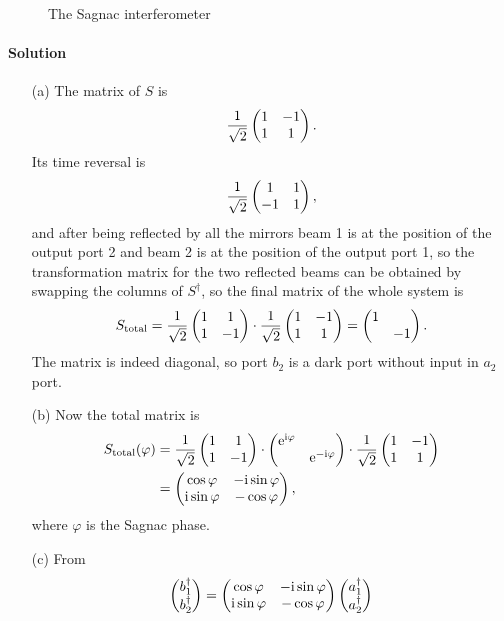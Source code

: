 \documentclass[hyperref, a4paper]{article}
\newcommand*{\ii}{\mathrm{i}}
\newcommand*{\ee}{\mathrm{e}}
\begin{document}
\begin{figure}
    \centering
    
    \caption{The Sagnac interferometer}
    \label{fig:sagnac-device}
\end{figure}

\paragraph{Solution} \begin{itemize}
    \item[(a)] The matrix of $S$ is 
    \[
        \frac{1}{\sqrt{2}} \pmqty{ 1 & -1 \\ 1 & 1 }.
    \]
    Its time reversal is 
    \[
        \frac{1}{\sqrt{2}} \pmqty{ 1 & 1 \\ -1 & 1 },
    \]
    and after being reflected by all the mirrors beam 1 is at the position of the output port 2 and beam 2 is at the position of the output port 1, so the transformation matrix for the two reflected beams can be obtained by swapping the columns of $S^\dagger$, so the final matrix of the whole system is 
    \begin{equation}
        S_\text{total} = \frac{1}{\sqrt{2}} \pmqty{ 1 & 1 \\ 1 & -1 } \cdot \frac{1}{\sqrt{2}} \pmqty{ 1 & -1 \\ 1 & 1 } = \pmqty{\dmat{1, -1}}.
    \end{equation} 
    The matrix is indeed diagonal, so port $b_2$ is a dark port without input in $a_2$ port.
    \item[(b)] Now the total matrix is 
    \begin{equation}
        \begin{aligned}
            S_\text{total}(\varphi) &= \frac{1}{\sqrt{2}} \pmqty{ 1 & 1 \\ 1 & -1 } \cdot \pmqty{\dmat{\ee^{\ii \varphi}, \ee^{- \ii \varphi}}} \cdot \frac{1}{\sqrt{2}} \pmqty{ 1 & -1 \\ 1 & 1 } \\
            &= \pmqty{ \cos \varphi & - \ii \sin \varphi \\ \ii \sin \varphi & - \cos \varphi },
        \end{aligned}
        \label{eq:sagnac-total-matrix}
    \end{equation} 
    where $\varphi$ is the Sagnac phase.
    \item[(c)] From
    \[
        \pmqty{b_1^\dagger \\ b_2^\dagger} = \pmqty{ \cos \varphi & - \ii \sin \varphi \\ \ii \sin \varphi & - \cos \varphi } \pmqty{a_1^\dagger \\ a_2^\dagger}
\]
\end{itemize}
\end{document}
